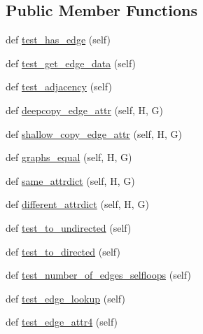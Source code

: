 \subsection*{Public Member Functions}
\begin{DoxyCompactItemize}
\item 
def \hyperlink{classnetworkx_1_1classes_1_1tests_1_1test__multigraph_1_1BaseMultiGraphTester_a8d851051550447dc04515a7964c7ad0a}{test\+\_\+has\+\_\+edge} (self)
\item 
def \hyperlink{classnetworkx_1_1classes_1_1tests_1_1test__multigraph_1_1BaseMultiGraphTester_a34d249b4540f7721c6ea76963d31884d}{test\+\_\+get\+\_\+edge\+\_\+data} (self)
\item 
def \hyperlink{classnetworkx_1_1classes_1_1tests_1_1test__multigraph_1_1BaseMultiGraphTester_a8305de7e7966f3135d53677881452044}{test\+\_\+adjacency} (self)
\item 
def \hyperlink{classnetworkx_1_1classes_1_1tests_1_1test__multigraph_1_1BaseMultiGraphTester_ad22fdb3005391073c0e2bf6f61d9e8e8}{deepcopy\+\_\+edge\+\_\+attr} (self, H, G)
\item 
def \hyperlink{classnetworkx_1_1classes_1_1tests_1_1test__multigraph_1_1BaseMultiGraphTester_a2ba632d87b60057c50dc5e5c9dc04254}{shallow\+\_\+copy\+\_\+edge\+\_\+attr} (self, H, G)
\item 
def \hyperlink{classnetworkx_1_1classes_1_1tests_1_1test__multigraph_1_1BaseMultiGraphTester_a5408abafb2dac0260b02d2b80646fc21}{graphs\+\_\+equal} (self, H, G)
\item 
def \hyperlink{classnetworkx_1_1classes_1_1tests_1_1test__multigraph_1_1BaseMultiGraphTester_a3fe467aa1a3a22e04afeed40b5540913}{same\+\_\+attrdict} (self, H, G)
\item 
def \hyperlink{classnetworkx_1_1classes_1_1tests_1_1test__multigraph_1_1BaseMultiGraphTester_aec77a183cbc46e6757cc96ad53351ef0}{different\+\_\+attrdict} (self, H, G)
\item 
def \hyperlink{classnetworkx_1_1classes_1_1tests_1_1test__multigraph_1_1BaseMultiGraphTester_a82a7c963bfbc8b6efc6a8dba50d050a9}{test\+\_\+to\+\_\+undirected} (self)
\item 
def \hyperlink{classnetworkx_1_1classes_1_1tests_1_1test__multigraph_1_1BaseMultiGraphTester_a6fe3b1376bc90ed804d937b9422c05eb}{test\+\_\+to\+\_\+directed} (self)
\item 
def \hyperlink{classnetworkx_1_1classes_1_1tests_1_1test__multigraph_1_1BaseMultiGraphTester_a68d6841296e2df9eb8540f3594655744}{test\+\_\+number\+\_\+of\+\_\+edges\+\_\+selfloops} (self)
\item 
def \hyperlink{classnetworkx_1_1classes_1_1tests_1_1test__multigraph_1_1BaseMultiGraphTester_ac1f97ff40151bd1f10a47a6211041404}{test\+\_\+edge\+\_\+lookup} (self)
\item 
def \hyperlink{classnetworkx_1_1classes_1_1tests_1_1test__multigraph_1_1BaseMultiGraphTester_a7a476c64b350c0d9c959f75f3ca01dcf}{test\+\_\+edge\+\_\+attr4} (self)
\end{DoxyCompactItemize}
